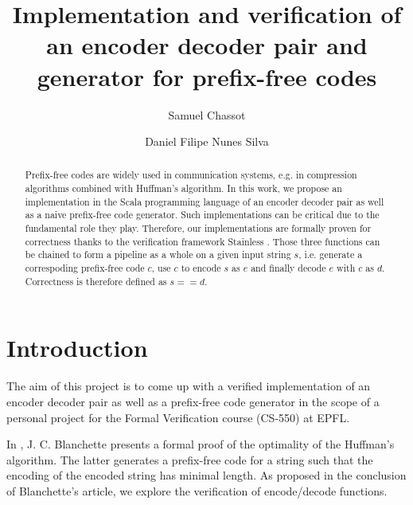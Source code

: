 \documentclass[a4paper,UKenglish,cleveref, autoref, thm-restate]{lipics-v2021}
\title{Implementation and verification of an encoder decoder pair and generator for prefix-free codes}
\author{Samuel Chassot}{EPFL}{samuel.chassot@epfl.ch}{}{}
\author{Daniel Filipe Nunes Silva}{EPFL}{daniel.nunessilva@epfl.ch}{}{}
\begin{document}
\maketitle

\begin{abstract}
    Prefix-free codes are widely used in communication systems, e.g. in compression algorithms combined with Huffman's algorithm. In this work, we propose an implementation in the Scala programming language of an encoder decoder pair as well as a naive prefix-free code generator. Such implementations can be critical due to the fundamental role they play. Therefore, our implementations are formally proven for correctness thanks to the verification framework Stainless \cite{stainless}. Those three functions can be chained to form a pipeline as a whole on a given input string $s$, i.e. generate a correspoding prefix-free code $c$, use $c$ to encode $s$ as $e$ and finally decode $e$ with $c$ as $d$. Correctness is therefore defined as $s == d$.
\end{abstract}

\lstset{language=scala}


\section{Introduction}
\label{sec:intro}

The aim of this project is to come up with a verified implementation of an encoder decoder pair as well as a prefix-free code generator in the scope of a personal project for the Formal Verification course (CS-550) at EPFL.

In \cite{blanchette}, J. C. Blanchette presents a formal proof of the optimality of the Huffman's algorithm. The latter generates a prefix-free code for a string such that the encoding of the encoded string has minimal length. As proposed in the conclusion of Blanchette's article, we explore the verification of encode/decode functions.
\end{document}
